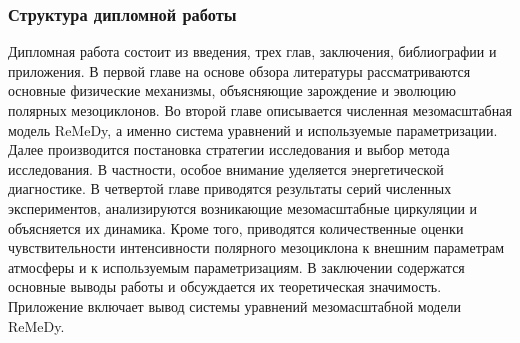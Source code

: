\subsubsection*{Структура дипломной работы}
Дипломная работа состоит из введения, трех глав, заключения, библиографии и приложения. В первой главе на основе обзора литературы рассматриваются основные физические механизмы, объясняющие зарождение и эволюцию полярных мезоциклонов. Во второй главе описывается численная мезомасштабная модель ReMeDy, а именно система уравнений и используемые параметризации. Далее производится постановка стратегии исследования и выбор метода исследования. В частности, особое внимание уделяется энергетической диагностике. В четвертой главе приводятся результаты серий численных экспериментов, анализируются возникающие мезомасштабные циркуляции и объясняется их динамика. Кроме того, приводятся количественные оценки чувствительности интенсивности полярного мезоциклона к внешним параметрам атмосферы и к используемым параметризациям. В заключении содержатся основные выводы работы и обсуждается их теоретическая значимость. Приложение включает вывод системы уравнений мезомасштабной модели ReMeDy.

%